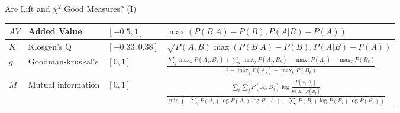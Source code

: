 \begin{frame}{Are Lift and $\chi^2$ Good Measures? (I)}
{\begin{tabular}{|m{}<{\centering}|m{}<{\centering}|m{}<{\centering}|m{}<{\centering}|}
			\hline
			$AV$            & Added Value        & $[-0.5,1]$     & $\max(P(B|A)-P(B),P(A|B)-P(A))$                                                                                                                           \\
			\hline
			$K$             & Klosgen's Q        & $[-0.33,0.38]$ & $\sqrt{P(A,B)}\max(P(B|A)-P(B),P(A|B)-P(A))$                                                                                                              \\
			\hline
			$g$             & Goodman-kruskal's  & $[0,1]$        & $\frac{\sum_j \max_k P(A_j,B_k) + \sum_k \max_j P(A_j,B_k)-\max_j P(A_j) -
			\max_k P(B_k)}{2 - \max_j P(A_j) - \max_k P(B_k)}$                                                                                                                                                                \\
			\hline
			$M$             & Mutual information & $[0,1]$        & $\frac{\sum_i \sum_j P(A_i,B_j) \log \frac{P(A_i,B_j)}{P(A_i)P(B_j)}}{\min(-\sum_i P(A_i) \log P(A_i)\log P(A_i),-\sum_i P(B_i)\log P(B_i) \log P(B_i))}$ \\
			\hline
		\end{tabular}
	}
\end{frame}

